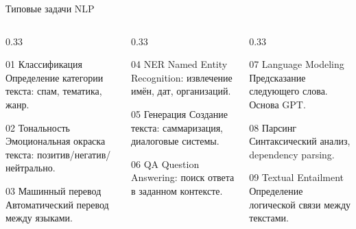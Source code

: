 \documentclass[aspectratio=169, 9pt]{beamer}
\begin{document}
\begin{frame}{Типовые задачи NLP}
  \begin{columns}[T]
    \begin{column}{0.33\textwidth}
      \begin{block}{01 Классификация}
        Определение категории текста: спам, тематика, жанр.
      \end{block}
      \vspace{0.2em}
      \begin{block}{02 Тональность}
        Эмоциональная окраска текста: позитив/негатив/нейтрально.
      \end{block}
      \vspace{0.2em}
      \begin{block}{03 Машинный перевод}
        Автоматический перевод между языками.
      \end{block}
    \end{column}
    \begin{column}{0.33\textwidth}
      \begin{block}{04 NER}
        Named Entity Recognition: извлечение имён, дат, организаций.
      \end{block}
      \vspace{0.2em}
      \begin{block}{05 Генерация}
        Создание текста: саммаризация, диалоговые системы.
      \end{block}
      \vspace{0.2em}
      \begin{block}{06 QA}
        Question Answering: поиск ответа в заданном контексте.
      \end{block}
    \end{column}
    \begin{column}{0.33\textwidth}
      \begin{block}{07 Language Modeling}
        Предсказание следующего слова. Основа GPT.
      \end{block}
      \vspace{0.2em}
      \begin{block}{08 Парсинг}
        Синтаксический анализ, dependency parsing.
      \end{block}
      \vspace{0.2em}
      \begin{block}{09 Textual Entailment}
        Определение логической связи между текстами.
      \end{block}
    \end{column}
  \end{columns}
\end{frame}
\end{document}
